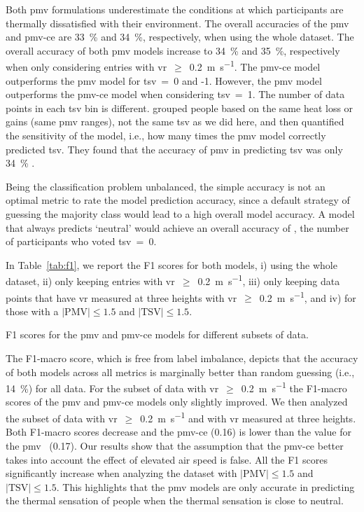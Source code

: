 Both \ac{pmv} formulations underestimate the conditions at which participants are thermally dissatisfied with their environment.
The overall accuracies of the \ac{pmv} and \ac{pmv-ce} are \qty{33}{\percent} and \qty{34}{\percent}, respectively, when using the whole dataset.
The overall accuracy of both \ac{pmv} models increase to \qty{34}{\percent} and \qty{35}{\percent}, respectively when only considering entries with \ac{vr}~$\geq$~\qty{0.2}{\m\per\s}.
The \ac{pmv-ce} model outperforms the \ac{pmv} model for \ac{tsv}~=~0 and -1.
However, the \ac{pmv} model outperforms the \ac{pmv-ce} model when considering \ac{tsv}~=~1.
The number of data points in each \ac{tsv} bin is different.
 grouped people based on the same heat loss or gains (same \ac{pmv} ranges), not the same \ac{tsv} as we did here, and then quantified the sensitivity of the model, i.e., how many times the \ac{pmv} model correctly predicted \ac{tsv}.
They found that the accuracy of \ac{pmv} in predicting \ac{tsv} was only \qty{34}{\percent} .

Being the classification problem unbalanced, the simple accuracy is not an optimal metric to rate the model prediction accuracy, since a default strategy of guessing the majority class would lead to a high overall model accuracy.
A model that always predicts `neutral' would achieve an overall accuracy of , the number of participants who voted \ac{tsv}~=~0.

In Table~\ref{tab:f1}, we report the F1 scores for both models, i) using the whole dataset, ii) only keeping entries with \ac{vr}~$\geq$~\qty{0.2}{\m\per\s}, iii) only keeping data points that have \ac{vr} measured at three heights with \ac{vr}~$\geq$~\qty{0.2}{\m\per\s}, and iv) for those with a $\lvert \textrm{PMV}\lvert \leq 1.5$ and $\lvert \textrm{TSV}\lvert \leq 1.5$.
\begin{table}[htb!]
    \centering
    
    \caption{F1 scores for the \ac{pmv} and \ac{pmv-ce} models for different subsets of data.}
    \label{tab:f1}
\end{table}
The F1-macro score, which is free from label imbalance, depicts that the accuracy of both models across all metrics is marginally better than random guessing (i.e., \qty{14}{\percent}) for all data.
For the subset of data with \ac{vr}~$\geq$~\qty{0.2}{\m\per\s} the F1-macro scores of the \ac{pmv} and \ac{pmv-ce} models only slightly improved.
We then analyzed the subset of data with \ac{vr}~$\geq$~\qty{0.2}{\m\per\s} and with \ac{vr} measured at three heights.
Both F1-macro scores decrease and the \ac{pmv-ce} (\num{0.16}) is lower than the value for the \ac{pmv}~ (\num{0.17}).
Our results show that the assumption that the \ac{pmv-ce} better takes into account the effect of elevated air speed is false.
All the F1 scores significantly increase when analyzing the dataset with $\lvert \textrm{PMV}\lvert \leq 1.5$ and $\lvert \textrm{TSV}\lvert \leq 1.5$.
This highlights that the \ac{pmv} models are only accurate in predicting the thermal sensation of people when the thermal sensation is close to neutral.

